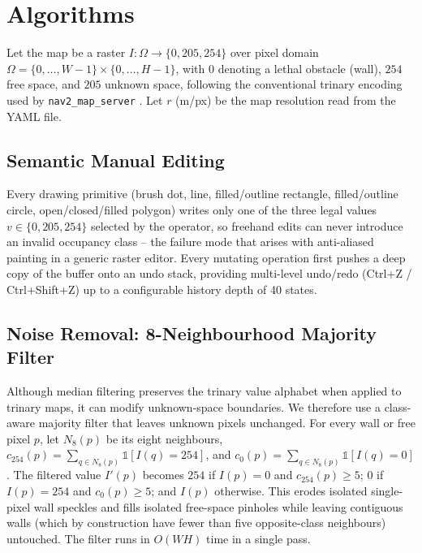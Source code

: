 \documentclass[journal]{IEEEtran}
\begin{document}
\section{Algorithms}
\label{sec:algorithms}
Let the map be a raster $I : \Omega \rightarrow \{0, 205, 254\}$ over pixel domain $\Omega = \{0,\dots,W-1\}\times\{0,\dots,H-1\}$, with $0$ denoting a lethal obstacle (wall), $254$ free space, and $205$ unknown space, following the conventional trinary encoding used by \texttt{nav2\_map\_server} \cite{nav2docs}. Let $r$ (m/px) be the map resolution read from the YAML file.

\subsection{Semantic Manual Editing}
Every drawing primitive (brush dot, line, filled/outline rectangle, filled/outline circle, open/closed/filled polygon) writes only one of the three legal values $v \in \{0,205,254\}$ selected by the operator, so freehand edits can never introduce an invalid occupancy class -- the failure mode that arises with anti-aliased painting in a generic raster editor. Every mutating operation first pushes a deep copy of the buffer onto an undo stack, providing multi-level undo/redo (Ctrl+Z / Ctrl+Shift+Z) up to a configurable history depth of 40 states.

\subsection{Noise Removal: 8-Neighbourhood Majority Filter}
Although median filtering preserves the trinary value alphabet when applied to trinary maps, it can modify unknown-space boundaries. We therefore use a class-aware majority filter that leaves unknown pixels unchanged. For every wall or free pixel $p$, let $N_8(p)$ be its eight neighbours, $c_{254}(p) = \sum_{q \in N_8(p)} \mathbb{1}[I(q)=254]$, and $c_{0}(p) = \sum_{q \in N_8(p)} \mathbb{1}[I(q)=0]$. The filtered value $I'(p)$ becomes $254$ if $I(p)=0$ and $c_{254}(p) \geq 5$; $0$ if $I(p)=254$ and $c_{0}(p) \geq 5$; and $I(p)$ otherwise. This erodes isolated single-pixel wall speckles and fills isolated free-space pinholes while leaving contiguous walls (which by construction have fewer than five opposite-class neighbours) untouched. The filter runs in $O(WH)$ time in a single pass.
\end{document}
